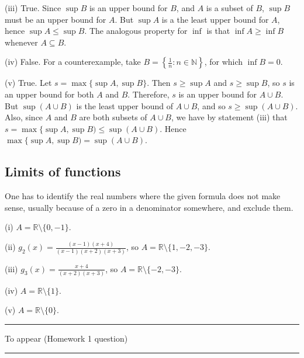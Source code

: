 \documentclass[letterpaper,10pt,english]{jupyterBook}
\begin{document}
\sphinxAtStartPar
(iii) True. Since \(\sup B\) is an upper bound for \(B\), and \(A\) is a subset of \(B\), \(\sup B\) must be an upper bound for \(A\). But \(\sup A\) is a the least upper bound for \(A\), hence \(\sup A\leq \sup B\). The analogous property for \(\inf\) is that \(\inf A\geq\inf B\) whenever \(A\subseteq B\).

\sphinxAtStartPar
(iv) False. For a counter\sphinxhyphen{}example, take \(B=\left\{\frac{1}{n}:n\in\mathbb{N}\right\}\), for which \(\inf B=0\).

\sphinxAtStartPar
(v) True. Let \(s=\max\{\sup A,\sup B\}\). Then \(s\geq \sup A\) and \(s\geq \sup B\), so \(s\) is an upper bound for both \(A\) and \(B\). Therefore, \(s\) is an upper bound for \(A\cup B\). But \(\sup(A\cup B)\) is the least upper bound of \(A\cup B\), and so \(s\geq\sup(A\cup B)\). Also, since \(A\) and \(B\) are both subsets of \(A\cup B\), we have by statement (iii) that \(s=\max\{\sup A,\sup B)\leq\sup(A\cup B)\). Hence \(\max\{\sup A,\sup B)=\sup(A\cup B)\).


\subsection{Limits of functions}
\label{\detokenize{Solutions-upto6:limits-of-functions}}\label{\detokenize{Solutions-upto6:ch2sol}}
\sphinxAtStartPar
{\hyperref[\detokenize{Problems:id1}]{}} One has to identify the real numbers where the given formula does not make sense, usually because of a zero in a denominator somewhere, and exclude them.

\sphinxAtStartPar
(i) \(A=\mathbb{R} \setminus \{0, -1\}\).

\sphinxAtStartPar
(ii) \(g_{2}(x) = \displaystyle\frac{(x-1)(x+4)}{(x-1)(x+2)(x+3)}\), so \(A=\mathbb{R} \setminus \{1, -2, -3\}\).

\sphinxAtStartPar
(iii) \(g_{3}(x) = \displaystyle\frac{x+4}{(x+2)(x+3)}\), so \(A=\mathbb{R} \setminus \{-2, -3\}\).

\sphinxAtStartPar
(iv) \(A=\mathbb{R} \setminus \{1\}\).

\sphinxAtStartPar
(v) \(A=\mathbb{R} \setminus \{0\}\).


\bigskip\hrule\bigskip


\sphinxAtStartPar
{\hyperref[\detokenize{Problems:id2}]{}} To appear (Homework 1 question)


\bigskip\hrule\bigskip
\end{document}
